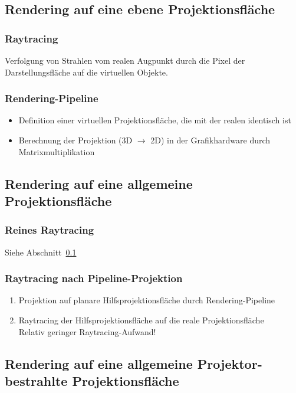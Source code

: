 \documentclass[a4paper, 12pt]{article}
\begin{document}
\subsection[Ebene Projektionsflächen]{Rendering auf eine ebene Projektionsfläche}
\label{subsec:even_proj}

\subsubsection*{Raytracing}
Verfolgung von Strahlen vom realen Augpunkt durch die Pixel der Darstellungsfläche auf die virtuellen Objekte.

\subsubsection*{Rendering-Pipeline}
\begin{itemize}
  \item Definition einer virtuellen Projektionsfläche, die mit der realen identisch ist
  \item Berechnung der Projektion (3D \(\rightarrow\) 2D) in der Grafikhardware durch Matrixmultiplikation
\end{itemize}


\subsection[Allgemeine Projektionsflächen]{Rendering auf eine allgemeine Projektionsfläche}

\subsubsection*{Reines Raytracing}
Siehe Abschnitt~\ref{subsec:even_proj}

\subsubsection*{Raytracing nach Pipeline-Projektion}
\begin{enumerate}
  \item Projektion auf planare Hilfsprojektionsfläche durch Rendering-Pipeline
  \item Raytracing der Hilfsprojektionsfläche auf die reale Projektionsfläche\\
    Relativ geringer Raytracing-Aufwand!
\end{enumerate}


\subsection[Projektor und allgemeine Projektionsflächen]{Rendering auf eine allgemeine Projektor-bestrahlte Projektionsfläche}
\end{document}
